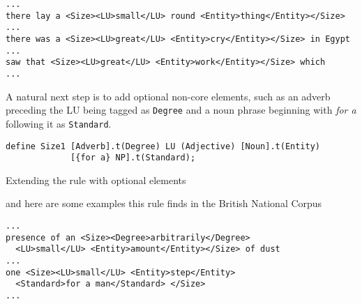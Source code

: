 \documentclass{llncs}
\begin{document}
\hfill \break
  \small
\begin{center}
  \begin{framed}
\begin{verbatim}
...
there lay a <Size><LU>small</LU> round <Entity>thing</Entity></Size>
...
there was a <Size><LU>great</LU> <Entity>cry</Entity></Size> in Egypt
...
saw that <Size><LU>great</LU> <Entity>work</Entity></Size> which
...
\end{verbatim}
\end{framed}
\end{center}
\normalsize

A natural next step is to add optional non-core elements, such as an adverb
preceding the LU being tagged as \verb+Degree+ and a noun phrase beginning with
\emph{for a} following it as \verb+Standard+.

\begin{table}[h]
\begin{center}
  \small
  \begin{framed}
\begin{verbatim}
define Size1 [Adverb].t(Degree) LU (Adjective) [Noun].t(Entity) 
             [{for a} NP].t(Standard);
\end{verbatim}
\end{framed}
\end{center}
\normalsize
\caption{Extending the rule with optional elements}
\end{table}

\noindent and here are some examples this rule finds in the British National
Corpus~\cite{bnc}

\begin{center}
  \small
  \begin{framed}
\begin{verbatim}
...
presence of an <Size><Degree>arbitrarily</Degree>
  <LU>small</LU> <Entity>amount</Entity></Size> of dust
...
one <Size><LU>small</LU> <Entity>step</Entity>
  <Standard>for a man</Standard> </Size>
...
\end{verbatim}
  \end{framed}
\end{center}
  \normalsize
\end{document}

